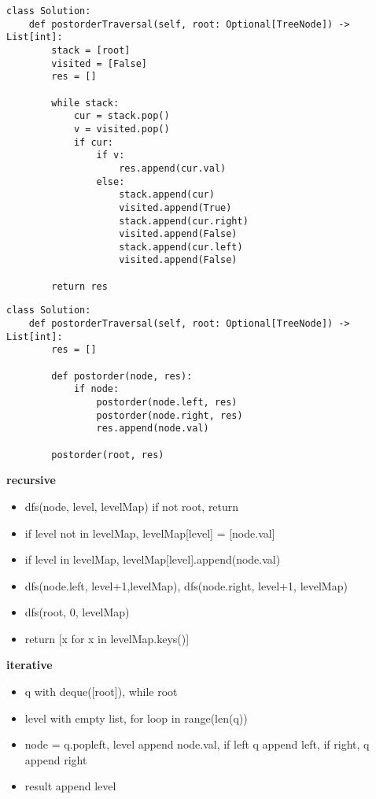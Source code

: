 \documentclass{assignmeownt}
\begin{document}
\begin{lstlisting}[caption = postorder traversal iterative]
    class Solution:
    def postorderTraversal(self, root: Optional[TreeNode]) -> List[int]:
        stack = [root]
        visited = [False]
        res = []

        while stack:
            cur = stack.pop()
            v = visited.pop()
            if cur:
                if v:
                    res.append(cur.val)
                else:
                    stack.append(cur)
                    visited.append(True)
                    stack.append(cur.right)
                    visited.append(False)
                    stack.append(cur.left)
                    visited.append(False)
        
        return res
\end{lstlisting}

\begin{lstlisting}[caption = postorder traversal dp]
    class Solution:
    def postorderTraversal(self, root: Optional[TreeNode]) -> List[int]:
        res = []
        
        def postorder(node, res):
            if node:
                postorder(node.left, res)
                postorder(node.right, res)
                res.append(node.val)
        
        postorder(root, res)
\end{lstlisting}



\textbf{recursive}
\begin{itemize}
    \item dfs(node, level, levelMap) if not root, return
    \item if level not in levelMap, levelMap[level] = [node.val]
    \item if level in levelMap, levelMap[level].append(node.val)
    \item dfs(node.left, level+1,levelMap), dfs(node.right, level+1, levelMap)
    \item dfs(root, 0, levelMap)
    \item return [x for x in levelMap.keys()]
\end{itemize}

\textbf{iterative}
\begin{itemize}
    \item q with deque([root]), while root
    \item level with empty list, for loop in range(len(q))
    \item node = q.popleft, level append node.val, if left q append left, if right, q append right
    \item result append level
\end{itemize}
\end{document}
